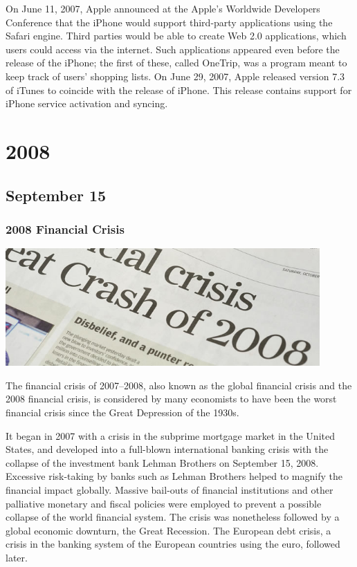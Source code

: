 \documentclass[11pt]{report}
\begin{document}
On June 11, 2007, Apple announced at the Apple's Worldwide Developers Conference that the iPhone would support third-party applications using the Safari engine. Third parties would be able to create Web 2.0 applications, which users could access via the internet. Such applications appeared even before the release of the iPhone; the first of these, called OneTrip, was a program meant to keep track of users' shopping lists. On June 29, 2007, Apple released version 7.3 of iTunes to coincide with the release of iPhone. This release contains support for iPhone service activation and syncing.

\chapter{2008}
\section{September 15}
\subsection{2008 Financial Crisis}
\vspace{2mm}\begin{center}\includegraphics[width=12cm]{./img/fcrash2008.jpg}\end{center}
The financial crisis of 2007–2008, also known as the global financial crisis and the 2008 financial crisis, is considered by many economists to have been the worst financial crisis since the Great Depression of the 1930s.

It began in 2007 with a crisis in the subprime mortgage market in the United States, and developed into a full-blown international banking crisis with the collapse of the investment bank Lehman Brothers on September 15, 2008. Excessive risk-taking by banks such as Lehman Brothers helped to magnify the financial impact globally. Massive bail-outs of financial institutions and other palliative monetary and fiscal policies were employed to prevent a possible collapse of the world financial system. The crisis was nonetheless followed by a global economic downturn, the Great Recession. The European debt crisis, a crisis in the banking system of the European countries using the euro, followed later.
\end{document}
